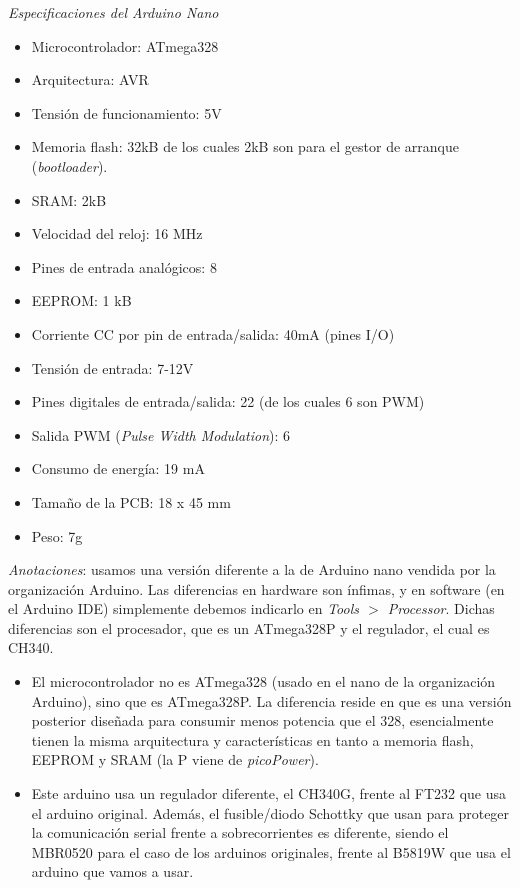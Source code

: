 \documentclass[12pt]{article}
\begin{document}
	\noindent \textit{Especificaciones del Arduino Nano} \\
	
	\begin{itemize}
		\item Microcontrolador: ATmega328
		\item Arquitectura: AVR
		\item Tensión de funcionamiento: 5V
		\item Memoria flash: 32kB de los cuales 2kB son para el gestor de arranque (\textit{bootloader}).
		\item SRAM: 2kB
		\item Velocidad del reloj: 16 MHz
		\item Pines de entrada analógicos: 8
		\item EEPROM: 1 kB
		\item Corriente CC por pin de entrada/salida: 40mA (pines I/O)
		\item Tensión de entrada: 7-12V
		\item Pines digitales de entrada/salida: 22 (de los cuales 6 son PWM)
		\item Salida PWM (\textit{Pulse Width Modulation}): 6
		\item Consumo de energía: 19 mA
		\item Tamaño de la PCB: 18 x 45 mm
		\item Peso: 7g
	\end{itemize}
	
	\noindent \textit{Anotaciones}: usamos una versión diferente a la de Arduino nano vendida por la organización Arduino. Las diferencias en hardware son ínfimas, y en software (en el Arduino IDE) simplemente debemos indicarlo en \textit{Tools $>$ Processor}. Dichas diferencias son el procesador, que es un ATmega328P y el regulador, el cual es CH340.\\
	
	\begin{itemize}
		\item El microcontrolador no es ATmega328 (usado en el nano de la organización Arduino), sino que es ATmega328P. La diferencia reside en que es una versión posterior diseñada para consumir menos potencia que el 328, esencialmente tienen la misma arquitectura y características en tanto a memoria flash, EEPROM y SRAM (la P viene de \textit{picoPower}).
		\item Este arduino usa un regulador diferente, el CH340G, frente al FT232 que usa el arduino original. Además, el fusible/diodo Schottky que usan para proteger la comunicación serial frente a sobrecorrientes es diferente, siendo el MBR0520 para el caso de los arduinos originales, frente al B5819W que usa el arduino que vamos a usar.
	\end{itemize}
\end{document}
